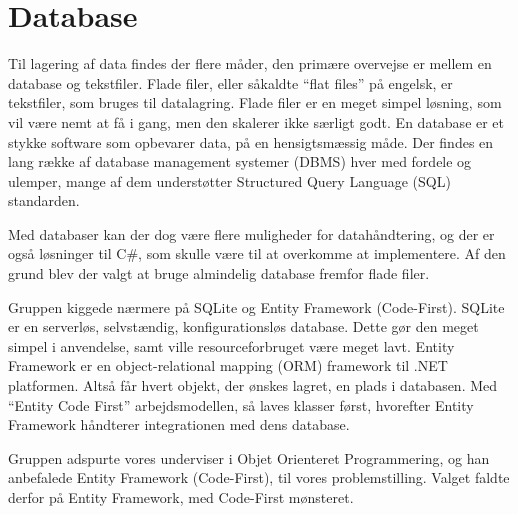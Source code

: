 \chapter{Database}
Til lagering af data findes der flere måder, den primære overvejse er mellem en database og tekstfiler.
Flade filer, eller såkaldte ``flat files'' på engelsk, er tekstfiler, som bruges til datalagring. 
Flade filer er en meget simpel løsning, som vil være nemt at få i gang, men den skalerer ikke særligt godt. 
En database er et stykke software som opbevarer data, på en hensigtsmæssig måde. 
Der findes en lang række af database management systemer (DBMS) hver med fordele og ulemper, mange af dem understøtter Structured Query Language (SQL) standarden.

Med databaser kan der dog være flere muligheder for datahåndtering, og der er også løsninger til C\#, som skulle være til at overkomme at implementere.\citep{flatfiles} 
Af den grund blev der valgt at bruge almindelig database fremfor flade filer. 

Gruppen kiggede nærmere på SQLite og Entity Framework (Code-First). 
SQLite er en serverløs, selvstændig, konfigurationsløs database. 
Dette gør den meget simpel i anvendelse, samt ville resourceforbruget være meget lavt. 
Entity Framework er en object-relational mapping (ORM) framework til .NET platformen. 
Altså får hvert objekt, der ønskes lagret, en plads i databasen. 
Med ``Entity Code First'' arbejdsmodellen, så laves klasser først, hvorefter Entity Framework håndterer integrationen med dens database.

Gruppen adspurte vores underviser i Objet Orienteret Programmering, og han anbefalede Entity Framework (Code-First), til vores problemstilling. 
Valget faldte derfor på Entity Framework, med Code-First mønsteret. 

